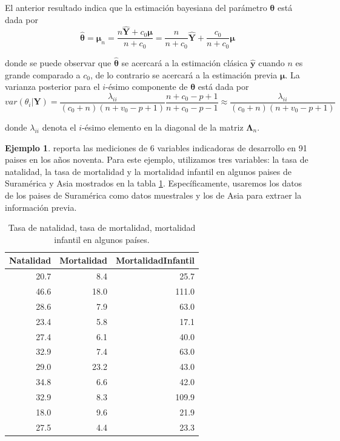 \documentclass[
  10pt,
  spanish,
]{book}
\theoremstyle{definition}
\theoremstyle{definition}
\newtheorem{example}{Ejemplo}[chapter]
\theoremstyle{definition}
\theoremstyle{definition}
\theoremstyle{remark}
\begin{document}
El anterior resultado indica que la estimación bayesiana del parámetro \(\boldsymbol \theta\) está dada por
\begin{equation*}
\hat{\boldsymbol \theta}=\mathbf{\mu}_n=\dfrac{n\hat{\mathbf{Y}}+c_0\mathbf{\mu}}{n+c_0}=\dfrac{n}{n+c_0}\hat{\mathbf{Y}}+\dfrac{c_0}{n+c_0}\mathbf{\mu}
\end{equation*}

donde se puede observar que \(\hat{\boldsymbol \theta}\) se acercará a la estimación clásica \(\hat{\mathbf{y}}\) cuando \(n\) es grande comparado a \(c_0\), de lo contrario se acercará a la estimación previa \(\mathbf{\mu}\). La varianza posterior para el \(i\)-ésimo componente de \(\boldsymbol \theta\) está dada por
\begin{equation*}
var(\theta_i|\mathbf{Y})=\dfrac{\lambda_{ii}}{(c_0+n)(n+v_0-p+1)}\dfrac{n+c_0-p+1}{n+c_0-p-1}\approx\dfrac{\lambda_{ii}}{(c_0+n)(n+v_0-p+1)}
\end{equation*}

donde \(\lambda_{ii}\) denota el \(i\)-ésimo elemento en la diagonal de la matriz \(\boldsymbol \Lambda_n\).

\begin{example}
\protect\hypertarget{exm:unnamed-chunk-49}{}{\label{exm:unnamed-chunk-49} }\citet{Pena2002} reporta las mediciones de 6 variables indicadoras de desarrollo en 91 paises en los años noventa. Para este ejemplo, utilizamos tres variables: la tasa de natalidad, la tasa de mortalidad y la mortalidad infantil en algunos paises de Suramérica y Asia mostrados en la tabla \ref{tab:Natalidad}. Específicamente, usaremos los datos de los paises de Suramérica como datos muestrales y los de Asia para extraer la información previa.
\end{example}

\begin{table}

\caption{\label{tab:Natalidad}Tasa de natalidad, tasa de mortalidad, mortalidad infantil en algunos países.}
\centering
\begin{tabular}[t]{r|r|r}
\hline
Natalidad & Mortalidad & MortalidadInfantil\\
\hline
20.7 & 8.4 & 25.7\\
\hline
46.6 & 18.0 & 111.0\\
\hline
28.6 & 7.9 & 63.0\\
\hline
23.4 & 5.8 & 17.1\\
\hline
27.4 & 6.1 & 40.0\\
\hline
32.9 & 7.4 & 63.0\\
\hline
29.0 & 23.2 & 43.0\\
\hline
34.8 & 6.6 & 42.0\\
\hline
32.9 & 8.3 & 109.9\\
\hline
18.0 & 9.6 & 21.9\\
\hline
27.5 & 4.4 & 23.3\\
\hline
\end{tabular}
\end{table}
\end{document}
